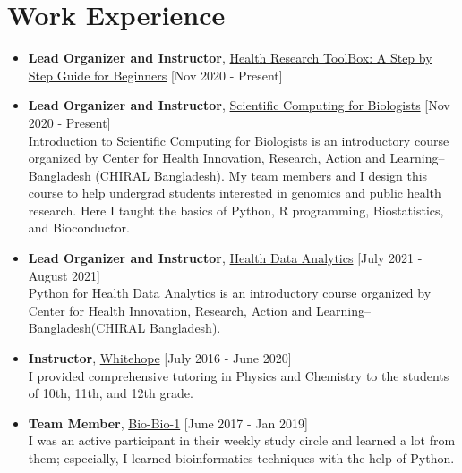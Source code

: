 \documentclass[11pt,a4paper]{moderncv}
\begin{document}
\section{Work Experience}
\begin{itemize}
	\item \textbf{Lead Organizer and Instructor}, 
	\textcolor{blue}{\href{https://scicomforbio.github.io/} {Health Research ToolBox: A Step by Step Guide for Beginners}} \hfil[Nov 2020 - Present] \\
	
	\item \textbf{Lead Organizer and Instructor}, 
	\textcolor{blue}{\href{https://scicomforbio.github.io/}{Scientific Computing for Biologists}} \hfil[Nov 2020 - Present] \\
	Introduction to Scientific Computing for Biologists is an introductory 
	course organized by Center for Health Innovation, Research, Action and Learning--Bangladesh (CHIRAL Bangladesh). My team members and I design this course to help  undergrad students interested in genomics and
	public health research. Here I taught the basics of Python, R programming, 
	Biostatistics, and Bioconductor. 
	
	\item \textbf{Lead Organizer and Instructor}, 
	\textcolor{blue}{\href{https://scicomforbio.github.io/}{Health Data Analytics}} \hfil[July 2021 - August 2021] \\
	Python for Health Data Analytics is an introductory 
	course organized by Center for Health Innovation, Research, Action and Learning--Bangladesh(CHIRAL Bangladesh).
	\item \textbf{Instructor}, 
	\textcolor{blue}{\href{}{Whitehope}}
	\hfill [July 2016 - June 2020]\\ 
	I provided comprehensive tutoring in Physics and Chemistry to the 
	students of 10th, 11th, and 12th grade.
	
	\item \textbf{Team Member}, 
	\textcolor{blue}{\href{}{Bio-Bio-1}}
	\hfill [June 2017 - Jan 2019]\\ 
	I was an active participant in their weekly study circle and learned a lot 
	from them; especially, I learned bioinformatics techniques with the 
	help of Python.
	
\end{itemize}
\end{document}
